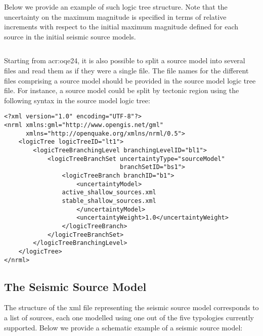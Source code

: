 Below we provide an example of such logic tree structure. Note that the
uncertainty on the maximum magnitude is specified in terms of relative
increments with respect to the initial maximum magnitude defined for each
source in the initial seismic source models.

\inputminted[firstline=1,firstnumber=1,fontsize=\footnotesize,frame=single,linenos,bgcolor=lightgray]{xml}{oqum/hazard/verbatim/input_sslt_simple_lt.xml}

Starting from \glsdesc{acr:oqe24}, it is also possible to split a source model
into several files and read them as if they were a single file. The file names
for the different files comprising a source model should be provided in the
source model logic tree file. For instance, a source model could be split by
tectonic region using the following syntax in the source model logic tree:

\begin{verbatim}
<?xml version="1.0" encoding="UTF-8"?>
<nrml xmlns:gml="http://www.opengis.net/gml"
      xmlns="http://openquake.org/xmlns/nrml/0.5">
    <logicTree logicTreeID="lt1">
        <logicTreeBranchingLevel branchingLevelID="bl1">
            <logicTreeBranchSet uncertaintyType="sourceModel"
                                branchSetID="bs1">
                <logicTreeBranch branchID="b1">
                    <uncertaintyModel>
		        active_shallow_sources.xml
		        stable_shallow_sources.xml
                    </uncertaintyModel>
                    <uncertaintyWeight>1.0</uncertaintyWeight>
                </logicTreeBranch>
            </logicTreeBranchSet>
        </logicTreeBranchingLevel>
    </logicTree>
</nrml>
\end{verbatim}


\subsection{The Seismic Source Model}

The structure of the xml file representing the seismic source model
corresponds to a list of sources, each one modelled using one out of the five
typologies currently supported. Below we provide a schematic example of a
seismic source model:

